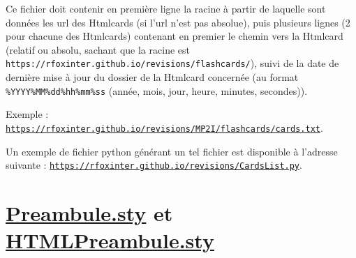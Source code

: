 \documentclass[a4paper,12pt]{article}
\let\oldsection\section
\newcommand{\ssection}[2][]{\clearpage\oldsection[#1]{#2}}
\begin{document}
Ce fichier doit contenir en première ligne la racine à partir de laquelle sont données les url des Htmlcards (si l'url n'est pas absolue), puis plusieurs lignes (2 pour chacune des Htmlcards) contenant en premier le chemin vers la Htmlcard (relatif ou absolu, sachant que la racine est \texttt{https://rfoxinter.github.io/revisions/flashcards/}), suivi de la date de dernière mise à jour du dossier de la Htmlcard concernée (au format \texttt{\%YYYY\%MM\%dd\%hh\%mm\%ss} (année, mois, jour, heure, minutes, secondes)).

Exemple : \href{https://rfoxinter.github.io/revisions/MP2I/flashcards/cards.txt}{\texttt{https://rfoxinter.github.io/revisions/MP2I/flashcards/cards.txt}}.

Un exemple de fichier python générant un tel fichier est disponible à l'adresse suivante : \href{https://rfoxinter.github.io/revisions/CardsList.py}{\texttt{https://rfoxinter.github.io/revisions/CardsList.py}}.
\ssection[Preambule.sty et HTMLPreambule.sty]{\href{https://rfoxinter.github.io/revisions/output/Preambule.sty}{\color{black}Preambule.sty} et \href{https://rfoxinter.github.io/revisions/output/HTMLPreambule.sty}{\color{black}HTMLPreambule.sty}}
\end{document}
